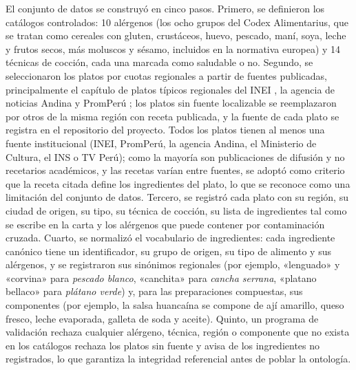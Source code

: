 \documentclass[conference]{IEEEtran}
\begin{document}
El conjunto de datos se construyó en cinco pasos. Primero, se definieron los catálogos controlados: 10 alérgenos (los ocho grupos del Codex Alimentarius, que se tratan como cereales con gluten, crustáceos, huevo, pescado, maní, soya, leche y frutos secos, más moluscos y sésamo, incluidos en la normativa europea) y 14 técnicas de cocción, cada una marcada como saludable o no. Segundo, se seleccionaron los platos por cuotas regionales a partir de fuentes publicadas, principalmente el capítulo de platos típicos regionales del INEI \cite{inei2012}, la agencia de noticias Andina \cite{andina2023} y PromPerú \cite{promperu}; los platos sin fuente localizable se reemplazaron por otros de la misma región con receta publicada, y la fuente de cada plato se registra en el repositorio del proyecto. Todos los platos tienen al menos una fuente institucional (INEI, PromPerú, la agencia Andina, el Ministerio de Cultura, el INS o TV Perú); como la mayoría son publicaciones de difusión y no recetarios académicos, y las recetas varían entre fuentes, se adoptó como criterio que la receta citada define los ingredientes del plato, lo que se reconoce como una limitación del conjunto de datos. Tercero, se registró cada plato con su región, su ciudad de origen, su tipo, su técnica de cocción, su lista de ingredientes tal como se escribe en la carta y los alérgenos que puede contener por contaminación cruzada. Cuarto, se normalizó el vocabulario de ingredientes: cada ingrediente canónico tiene un identificador, su grupo de origen, su tipo de alimento y sus alérgenos, y se registraron sus sinónimos regionales (por ejemplo, «lenguado» y «corvina» para \emph{pescado blanco}, «canchita» para \emph{cancha serrana}, «platano bellaco» para \emph{plátano verde}) y, para las preparaciones compuestas, sus componentes (por ejemplo, la salsa huancaína se compone de ají amarillo, queso fresco, leche evaporada, galleta de soda y aceite). Quinto, un programa de validación rechaza cualquier alérgeno, técnica, región o componente que no exista en los catálogos rechaza los platos sin fuente y avisa de los ingredientes no registrados, lo que garantiza la integridad referencial antes de poblar la ontología.
\end{document}
